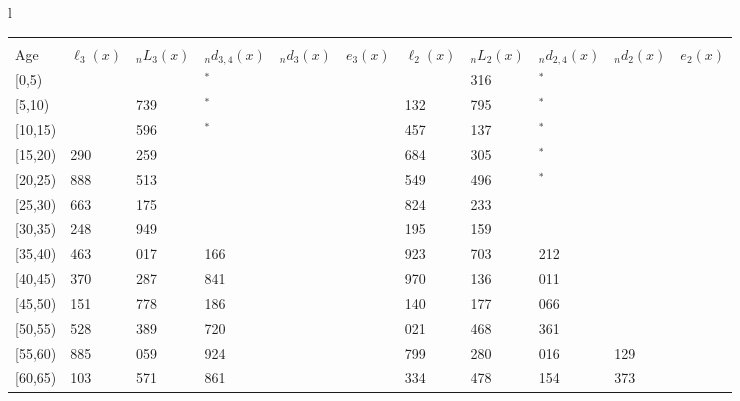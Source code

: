 \documentclass[
]{article}
\begin{document}
\begin{table}
\begin{tabular}[t]{l}
\end{tabular}
\centering
\begin{tabular}[t]{l}
\hline
\begin{tabular}{>{\raggedright\arraybackslash}p{.43in}>{\raggedleft\arraybackslash}p{.42in}>{\raggedleft\arraybackslash}p{.42in}>{\raggedleft\arraybackslash}p{.42in}>{\raggedleft\arraybackslash}p{.42in}>{\raggedleft\arraybackslash}p{.42in}>{\raggedleft\arraybackslash}p{.42in}>{\raggedleft\arraybackslash}p{.42in}>{\raggedleft\arraybackslash}p{.42in}>{\raggedleft\arraybackslash}p{.42in}>{\raggedleft\arraybackslash}p{.42in}}
\toprule
\multicolumn{1}{c}{ } & \multicolumn{5}{c}{(2) Lost mother only} & \multicolumn{5}{c}{(3) Lost father only} \\
\cmidrule(l{3pt}r{3pt}){2-6} \cmidrule(l{3pt}r{3pt}){7-11}
Age & $\ell_{3}(x)$ & ${}_nL_{3}(x)$ & ${}_nd_{3,4}(x)$ & ${}_nd_{3}(x)$ & $e_{3}(x)$ & $\ell_{2}(x)$ & ${}_nL_{2}(x)$ & ${}_nd_{2,4}(x)$ & ${}_nd_{2}(x)$ & $e_{2}(x)$\\
\midrule
{}[0,5) & 0 & 695 & 17$^{*}$ & 1 & 4 & 0 & 2 316 & 0$^{*}$ & 3 & 11\\
{}[5,10) & 350 & 2 739 & 21$^{*}$ & 0 & 4 & 1 132 & 8 795 & 13$^{*}$ & 1 & 11\\
{}[10,15) & 822 & 5 596 & 32$^{*}$ & 1 & 4 & 2 457 & 16 137 & 38$^{*}$ & 2 & 11\\
{}[15,20) & 1 290 & 8 259 & 213 & 4 & 4 & 3 684 & 25 305 & 76$^{*}$ & 13 & 11\\
{}[20,25) & 1 888 & 12 513 & 252 & 12 & 4 & 5 549 & 37 496 & 152$^{*}$ & 36 & 11\\
\addlinespace
{}[25,30) & 2 663 & 19 175 & 249 & 23 & 4 & 7 824 & 52 233 & 465 & 64 & 11\\
{}[30,35) & 4 248 & 27 949 & 764 & 41 & 4 & 10 195 & 69 159 & 602 & 101 & 10\\
{}[35,40) & 5 463 & 36 017 & 1 166 & 65 & 3 & 12 923 & 88 703 & 1 212 & 160 & 9\\
{}[40,45) & 6 370 & 42 287 & 1 841 & 99 & 3 & 16 970 & 111 136 & 2 011 & 260 & 9\\
{}[45,50) & 7 151 & 47 778 & 2 186 & 162 & 3 & 20 140 & 129 177 & 3 066 & 438 & 7\\
\addlinespace
{}[50,55) & 7 528 & 50 389 & 3 720 & 258 & 2 & 23 021 & 139 468 & 6 361 & 714 & 6\\
{}[55,60) & 6 885 & 46 059 & 3 924 & 365 & 2 & 22 799 & 142 280 & 6 016 & 1 129 & 5\\
{}[60,65) & 5 103 & 41 571 & 4 861 & 494 & 1 & 21 334 & 115 478 & 10 154 & 1 373 & 3\\

\end{tabular}
\end{tabular}
\end{table}
\end{document}

